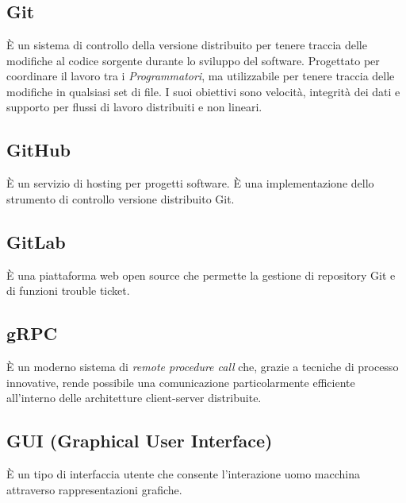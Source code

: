 \section{}
\subsection*{Git}
È un sistema di controllo della versione distribuito per tenere traccia delle modifiche al codice sorgente durante lo sviluppo del software. Progettato per coordinare il lavoro tra i \textit{Programmatori}, ma utilizzabile per tenere traccia delle modifiche in qualsiasi set di file. I suoi obiettivi sono velocità, integrità dei dati e supporto per flussi di lavoro distribuiti e non lineari.

\subsection*{GitHub}
È un servizio di hosting per progetti software. È una implementazione dello strumento di controllo versione distribuito Git.

\subsection*{GitLab} È una piattaforma web open source che permette la gestione di repository Git e di funzioni trouble ticket.

\subsection*{gRPC} È un moderno sistema di \textit{remote procedure call} che, grazie a tecniche di processo innovative, rende possibile una comunicazione particolarmente efficiente all’interno delle architetture client-server distribuite.

\subsection*{GUI (Graphical User Interface)} È un tipo di interfaccia utente che consente l'interazione uomo macchina attraverso rappresentazioni grafiche.